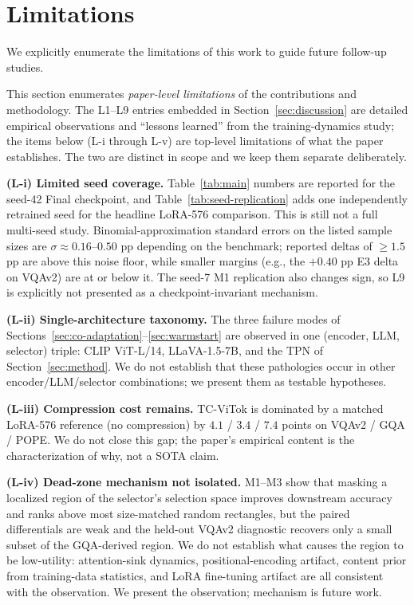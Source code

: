 \documentclass{article}
\begin{document}
\section{Limitations}
\label{sec:limitations}

We explicitly enumerate the limitations of this work to guide future
follow-up studies.

This section enumerates \emph{paper-level limitations} of the contributions
and methodology. The L1--L9 entries embedded in Section~\ref{sec:discussion}
are detailed empirical observations and ``lessons learned'' from the
training-dynamics study; the items below (L-i through L-v) are top-level
limitations of what the paper establishes. The two are distinct in scope and
we keep them separate deliberately.

\textbf{(L-i) Limited seed coverage.}
Table~\ref{tab:main} numbers are reported for the seed-42 Final checkpoint, and
Table~\ref{tab:seed-replication} adds one independently retrained seed for the
headline LoRA-576 comparison. This is still not a full multi-seed study.
Binomial-approximation standard errors on the listed sample sizes are
$\sigma \approx 0.16$--$0.50$ pp depending on the benchmark; reported deltas of
$\geq 1.5$ pp are above this noise floor, while smaller margins (e.g., the
$+0.40$ pp E3 delta on VQAv2) are at or below it. The seed-7 M1 replication
also changes sign, so L9 is explicitly not presented as a checkpoint-invariant
mechanism.

\textbf{(L-ii) Single-architecture taxonomy.}
The three failure modes of
Sections~\ref{sec:co-adaptation}--\ref{sec:warmstart} are observed in one
(encoder, LLM, selector) triple: CLIP ViT-L/14, LLaVA-1.5-7B, and the TPN of
Section~\ref{sec:method}. We do not establish that these pathologies occur
in other encoder/LLM/selector combinations; we present them as testable
hypotheses.

\textbf{(L-iii) Compression cost remains.}
TC-ViTok is dominated by a matched LoRA-576 reference (no compression) by
$4.1$ / $3.4$ / $7.4$ points on VQAv2 / GQA / POPE. We do not close this gap;
the paper's empirical content is the characterization of why, not a SOTA claim.

\textbf{(L-iv) Dead-zone mechanism not isolated.}
M1--M3 show that masking a localized region of the selector's selection space
improves downstream accuracy and ranks above most size-matched random
rectangles, but the paired differentials are weak and the held-out VQAv2
diagnostic recovers only a small subset of the GQA-derived region. We do not
establish what causes the region to be low-utility: attention-sink dynamics,
positional-encoding artifact, content prior from training-data statistics, and
LoRA fine-tuning artifact are all consistent with the observation. We present
the observation; mechanism is future work.
\end{document}
